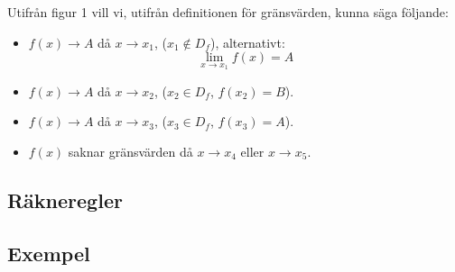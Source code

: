 \documentclass[swedish]{article}
\begin{document}
Utifrån figur 1 vill vi, utifrån definitionen för gränsvärden, kunna säga följande:

\begin{itemize}
    \item{$f(x) \to A$ då $x \to x_1$, ($x_1 \notin D_f$), alternativt: \\
        \[\lim_{x \to x_1} f(x) = A\]}
    \item{$f(x) \to A$ då $x \to x_2$, ($x_2 \in D_f$, $f(x_2) = B$).}
    \item{$f(x) \to A$ då $x \to x_3$, ($x_3 \in D_f$, $f(x_3) = A$).}
    \item{$f(x)$ saknar gränsvärden då $x \to x_4$ eller $x \to x_5$.}
\end{itemize}

\subsection{Räkneregler}

\subsection{Exempel}
\end{document}
